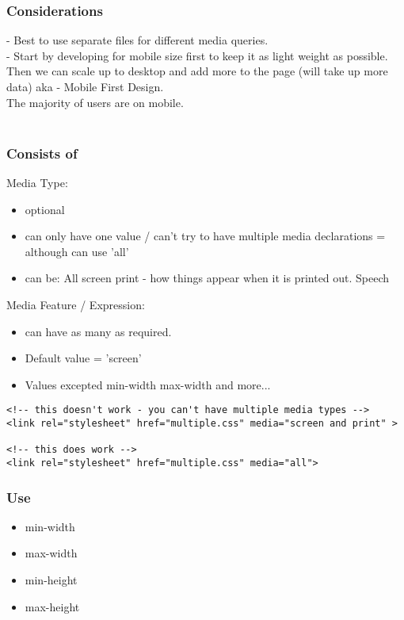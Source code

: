 \documentclass[]{article}
\newcommand{\<}{\guilsinglleft}
\renewcommand{\>}{\guilsinglright}
\begin{document}
\subsubsection{Considerations}
 - Best to use separate files for different media queries.
\\
 - Start by developing for mobile size first to keep it as light weight as possible.   Then we can scale up to desktop and add more to the page (will take up more data) aka - Mobile First Design.  \\
 The majority of users are on mobile.
\\\\
\subsubsection{Consists of}
Media Type:
\begin{itemize}
	\item optional
	\item can only have one value / can't try to have multiple media declarations = although can use 'all'
	
	\item can be:
	\subitem All
	\subitem screen
	\subitem print - how things appear when it is printed out.
	\subitem Speech
\end{itemize}

Media Feature / Expression:
\begin{itemize}
	\item can have as many as required.
	\item Default value = 'screen'
	\item Values excepted
	\subitem min-width 
	\subitem max-width
	\subitem and more...
\end{itemize}

\begin{lstlisting}
<!-- this doesn't work - you can't have multiple media types -->
<link rel="stylesheet" href="multiple.css" media="screen and print" >

<!-- this does work -->
<link rel="stylesheet" href="multiple.css" media="all">
\end{lstlisting}

\subsubsection{Use}
\begin{itemize}
	\item min-width
	\item max-width
	\item min-height
	\item max-height
\end{itemize}
\end{document}
